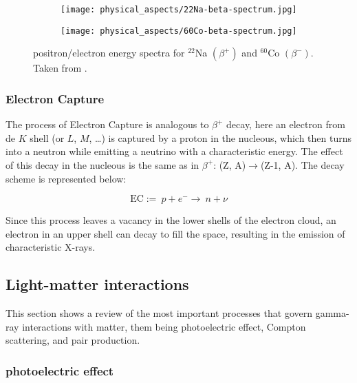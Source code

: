\begin{figure}[H]
    \centering
    \begin{subfigure}[t]{0.45\textwidth}
      \texttt{[image: physical\_aspects/22Na-beta-spectrum.jpg]}
      \caption{\label{sfig:22Na_beta_spectra}}
    \end{subfigure}
    \begin{subfigure}[t]{0.45\textwidth}
      \texttt{[image: physical\_aspects/60Co-beta-spectrum.jpg]}
      \caption{\label{sfig:60Co_beta_spectra}}
    \end{subfigure}
    \caption{\label{fig:beta_spectra}positron/electron energy spectra for   $^{22}$Na $(\beta^+)$ and   $^{60}$Co $(\beta^-)$. Taken from \cite{IAEA}.}
\end{figure}

\subsubsection{Electron Capture}

The process of Electron Capture is analogous to $\beta^+$ decay, here an electron from de $K$ shell (or $L$, $M$, \dots) is captured by a proton in the nucleous, which then turns into a neutron while emitting a neutrino with a characteristic energy. The effect of this decay in the nucleous is the same as in $\beta^+$: (Z, A)$\rightarrow$(Z-1, A). The decay scheme is represented below:

\begin{equation}
  \text{EC} :=~ p + e^- \rightarrow ~ n + \nu
\end{equation}

Since this process leaves a vacancy in the lower shells of the electron cloud, an electron in an upper shell can decay to fill the space, resulting in the emission of characteristic X-rays.

\subsection{Light-matter interactions}

This section shows a review of the most important processes that govern gamma-ray interactions with matter, them being photoelectric effect, Compton scattering, and pair production.

\subsubsection{photoelectric effect}

